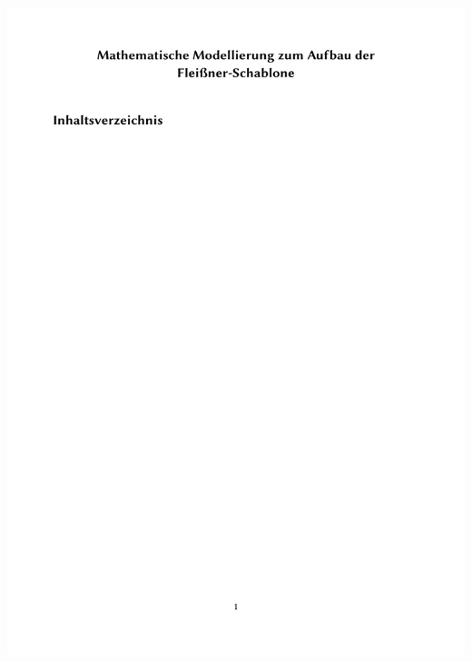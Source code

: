 \documentclass{beamer}
\begin{document}
\begin{frame}
\includegraphics[page=3, scale=0.25]{mathModell.pdf}
\end{frame}
\end{document}
